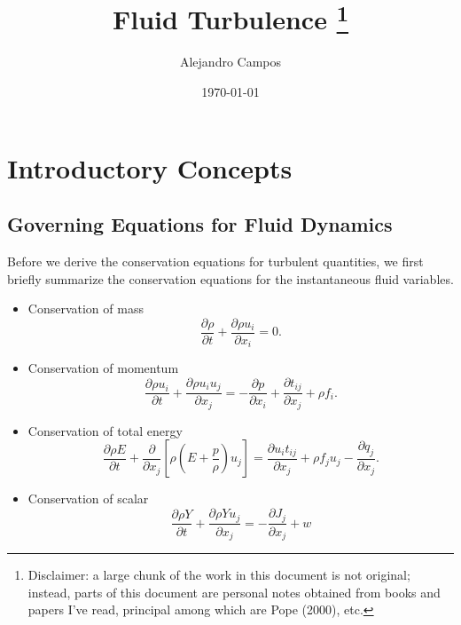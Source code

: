 \documentclass[oneside,a4paper,11pt]{report}
\title{Fluid Turbulence \thanks{Disclaimer: a large chunk of the work in this document is not original; instead, parts of this document are personal notes obtained from books and papers I've read, principal among which are Pope (2000), etc.}}
\date{\today}
\author{Alejandro Campos}
\begin{document}
\maketitle
\tableofcontents

\part{Introductory Concepts}

\chapter{Governing Equations for Fluid Dynamics}
Before we derive the conservation equations for turbulent quantities, we first briefly summarize the conservation equations for the instantaneous fluid variables.
\begin{itemize}
\item Conservation of mass
\begin{equation}
    \label{eq:cons_mass}
    \frac{\partial \rho}{\partial t} + \frac{ \partial \rho u_i}{ \partial x_i} = 0.
\end{equation}
\item Conservation of momentum
\begin{equation}
    \label{eq:cons_momentum}
    \frac{\partial \rho u_i}{\partial t}+\frac{\partial \rho u_i u_j}{\partial x_j} =-\frac{\partial p}{\partial x_i} + \frac{\partial t_{ij}}{\partial x_j} + \rho f_i.
\end{equation}
\item Conservation of total energy
\begin{equation}
    \label{eq:cons_energy}
    \frac{\partial \rho E}{\partial t} + \frac{\partial}{\partial x_j} \left [ \rho \left ( E + \frac{p}{\rho} \right ) u_j \right ] = \frac{\partial u_i t_{ij}}{\partial x_j} + \rho f_j u_j - \frac{\partial q_j}{\partial x_j}.
\end{equation}
\item Conservation of scalar
\begin{equation}
    \label{eq:cons_scalar}
    \frac{\partial \rho Y}{\partial t} + \frac{\partial \rho Y u_j}{\partial x_j} = -\frac{\partial J_j}{\partial x_j} + w
\end{equation}
\end{itemize}
\end{document}
